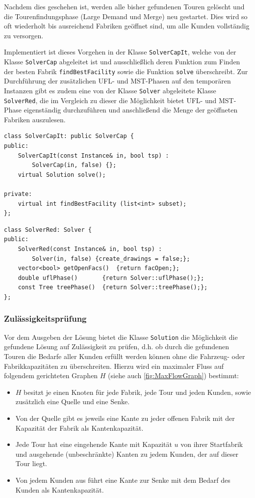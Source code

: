 \documentclass[a4paper,ngerman,11pt,bibtotoc]{scrartcl}
\theoremstyle{definition}
\theoremstyle{plain}
\theoremstyle{remark}
\newcommand{\MST}{MST}
\newcommand{\UFL}{UFL}
\begin{document}
	Nachdem dies geschehen ist, werden alle bisher gefundenen Touren gelöscht und die Tourenfindungsphase (Large Demand und Merge) neu gestartet. Dies wird so oft wiederholt bis ausreichend Fabriken geöffnet sind, um alle Kunden vollständig zu versorgen.
	
	Implementiert ist dieses Vorgehen in der Klasse \lstinline|SolverCapIt|, welche von der Klasse \lstinline|SolverCap| abgeleitet ist und ausschließlich deren Funktion zum Finden der \glqq besten\grqq{} Fabrik \lstinline|findBestFacility| sowie die Funktion \lstinline|solve| überschreibt. Zur Durchführung der zusätzlichen \UFL- und \MST-Phasen auf den temporären Instanzen gibt es zudem eine von der Klasse \lstinline|Solver| abgeleitete Klasse \lstinline|SolverRed|, die im Vergleich zu dieser die Möglichkeit bietet \UFL- und \MST-Phase eigenständig durchzuführen und anschließend die Menge der geöffneten Fabriken auszulesen.

	\begin{lstlisting}[caption=Die Klasse SolverCapIt]
class SolverCapIt: public SolverCap {
public:
	SolverCapIt(const Instance& in, bool tsp) : 
		SolverCap(in, false) {};
	virtual Solution solve();

private:
	virtual int findBestFacility (list<int> subset);
};
	\end{lstlisting}	
	\begin{lstlisting}[caption=Die Klasse SolverRed]
class SolverRed: Solver {
public:
	SolverRed(const Instance& in, bool tsp) : 
		Solver(in, false) {create_drawings = false;};
	vector<bool> getOpenFacs() 	{return facOpen;};
	double uflPhase() 		{return Solver::uflPhase();};
	const Tree treePhase()	{return Solver::treePhase();};
};
	\end{lstlisting}
	
	\subsubsection{Zulässigkeitsprüfung}
	
	Vor dem Ausgeben der Lösung bietet die Klasse \lstinline|Solution| die Möglichkeit die gefundene Lösung auf Zulässigkeit zu prüfen, d.h. ob durch die gefundenen Touren die Bedarfe aller Kunden erfüllt werden können ohne die Fahrzeug- oder Fabrikkapazitäten zu überschreiten. Hierzu wird ein maximaler Fluss auf folgendem gerichteten Graphen $H$ (siehe auch \cref{fig:MaxFlowGraph}) bestimmt:
	\begin{itemize}
		\item $H$ besitzt je einen Knoten für jede Fabrik, jede Tour und jeden Kunden, sowie zusätzlich eine Quelle und eine Senke.
		\item Von der Quelle gibt es jeweils eine Kante zu jeder offenen Fabrik mit der Kapazität der Fabrik als Kantenkapazität.
		\item Jede Tour hat eine eingehende Kante mit Kapazität $u$ von ihrer Startfabrik und ausgehende (unbeschränkte) Kanten zu jedem Kunden, der auf dieser Tour liegt.
		\item Von jedem Kunden aus führt eine Kante zur Senke mit dem Bedarf des Kunden als Kantenkapazität.
	\end{itemize}
	
\end{document}
